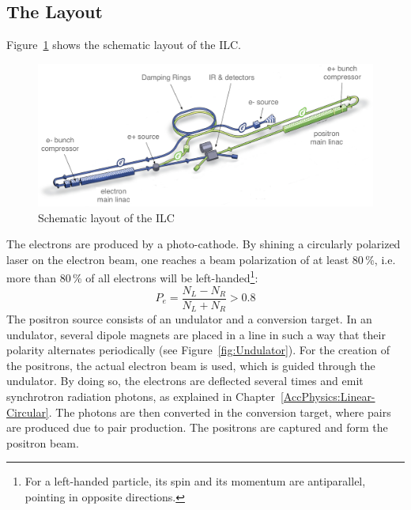 \subsection{The Layout}
Figure~\ref{fig:ILC_Layout} shows the schematic layout of the ILC.
\begin{figure}
\centering
\includegraphics[width=\textwidth]{Figures/ILC_layout_edited.png}
\caption[Schematic layout of the ILC]{Schematic layout of the ILC~\cite[cf. p. 9]{TDR1}}
\label{fig:ILC_Layout}
\end{figure}
The electrons are produced by a photo-cathode.
By shining a circularly polarized laser on the electron beam, one reaches a beam polarization of at least 80\,\%, i.e. more than 80\,\% of all electrons will be left-handed\footnote{For a left-handed particle, its spin and its momentum are antiparallel, pointing in opposite directions.}:
\begin{equation}
 P_e = \frac{N_L-N_R}{N_L+N_R} > 0.8
\end{equation}
The positron source consists of an undulator and a conversion target.
In an undulator, several dipole magnets are placed in a line in such a way that their polarity alternates periodically (see Figure~\ref{fig:Undulator}).
For the creation of the positrons, the actual electron beam is used, which is guided through the undulator.
By doing so, the electrons are deflected several times and emit synchrotron radiation photons, as explained in Chapter~\ref{AccPhysics:Linear-Circular}.
The photons are then converted in the conversion target, where \positron \electron pairs are produced due to pair production.
The positrons are captured and form the positron beam.
